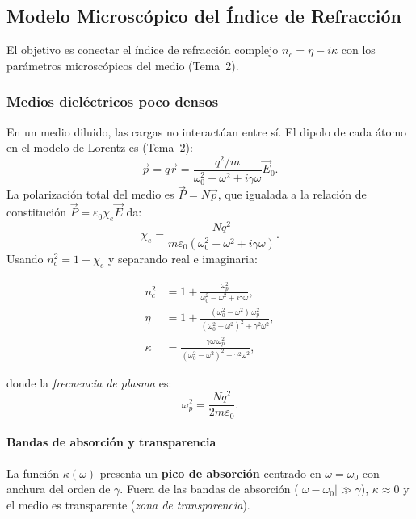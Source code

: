 \documentclass[12pt, a4paper]{article}
\theoremstyle{plain}
\theoremstyle{definition}
\theoremstyle{remark}
\newcommand{\ve}[1]{\vec{#1}}
\begin{document}
\subsection{Modelo Microscópico del Índice de Refracción}

El objetivo es conectar el índice de refracción complejo $n_c = \eta - i\kappa$
con los parámetros microscópicos del medio (Tema~2).

\subsubsection{Medios dieléctricos poco densos}

En un medio diluido, las cargas no interactúan entre sí. El dipolo de cada
átomo en el modelo de Lorentz es (Tema~2):
\[
  \ve{p} = q\ve{r} = \frac{q^2/m}{\omega_0^2-\omega^2+i\gamma\omega}\ve{E}_0.
\]
La polarización total del medio es $\ve{P} = N\ve{p}$, que igualada a la
relación de constitución $\ve{P} = \varepsilon_0\chi_e\ve{E}$ da:
\[
  \chi_e = \frac{Nq^2}{m\varepsilon_0(\omega_0^2-\omega^2+i\gamma\omega)}.
\]
Usando $n_c^2 = 1 + \chi_e$ y separando real e imaginaria:

\begin{mdframed}[style=resultado]
\begin{align}
  n_c^2 &= 1 + \frac{\omega_p^2}{\omega_0^2-\omega^2+i\gamma\omega},
  \label{eq:nc2_diluido}\\[6pt]
  \eta &= 1 + \frac{(\omega_0^2-\omega^2)\,\omega_p^2}
              {(\omega_0^2-\omega^2)^2+\gamma^2\omega^2},
  \label{eq:n_diluido}\\[6pt]
  \kappa &= \frac{\gamma\omega\,\omega_p^2}
              {(\omega_0^2-\omega^2)^2+\gamma^2\omega^2},
  \label{eq:kappa_diluido}
\end{align}
\end{mdframed}
donde la \emph{frecuencia de plasma} es:
\begin{equation}
  \omega_p^2 = \frac{Nq^2}{2m\varepsilon_0}. \label{eq:plasma}
\end{equation}

\paragraph{Bandas de absorción y transparencia}

La función $\kappa(\omega)$ presenta un \textbf{pico de absorción} centrado
en $\omega = \omega_0$ con anchura del orden de $\gamma$. Fuera de las bandas
de absorción ($|\omega-\omega_0|\gg\gamma$), $\kappa\approx 0$ y el medio
es transparente (\emph{zona de transparencia}).
\end{document}
